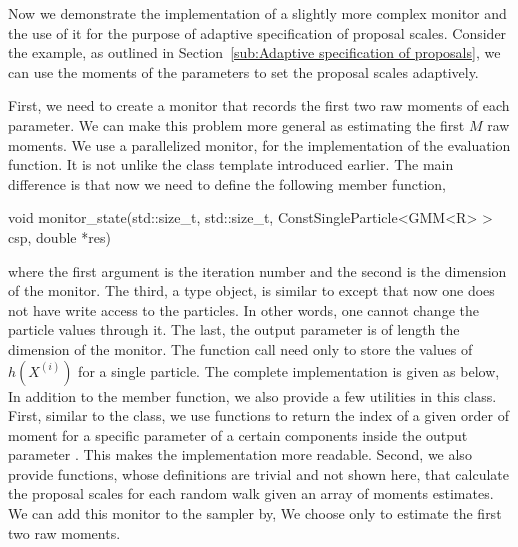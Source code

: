 Now we demonstrate the implementation of a slightly more complex monitor and
the use of it for the purpose of adaptive specification of proposal scales.
Consider the \gmm example, as outlined in Section~\ref{sub:Adaptive
  specification of proposals}, we can use the moments of the parameters to set
the proposal scales adaptively.

First, we need to create a monitor that records the first two raw moments of
each parameter. We can make this problem more general as estimating the first
$M$ raw moments. We use a parallelized monitor,  for
the implementation of the evaluation function. It is not unlike the
 class template introduced earlier. The main difference is
that now we need to define the following member function,
\begin{cppcode}
void monitor_state(std::size_t, std::size_t,
        ConstSingleParticle<GMM<R> > csp, double *res)
\end{cppcode}
where the first argument is the iteration number and the second is the
dimension of the monitor. The third, a  type
object, is similar to  except that now one does not
have write access to the particles. In other words, one cannot change the
particle values through it. The last, the output parameter  is
of length the dimension of the monitor. The function call need only to store
the values of $h(X^{(i)})$ for a single particle. The complete implementation
is given as below,
In addition to the  member function, we also provide
a few utilities in this class. First, similar to the  class, we
use functions to return the index of a given order of moment for a specific
parameter of a certain components inside the output parameter .
This makes the implementation more readable. Second, we also provide
functions, whose definitions are trivial and not shown here, that calculate
the proposal scales for each random walk given an array of moments estimates.
We can add this monitor to the sampler by,
We choose only to estimate the first two raw moments.

